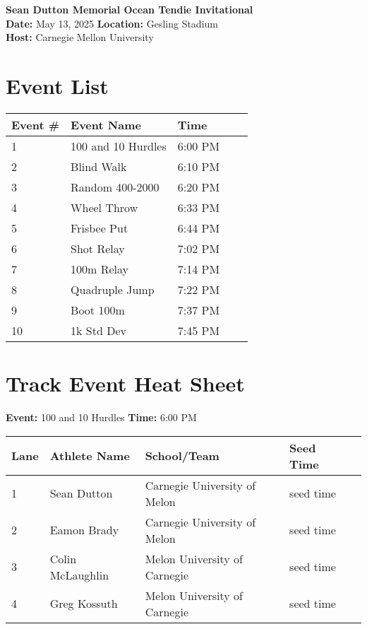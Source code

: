 \documentclass[11pt]{article}
\begin{document}
\begin{center}
    \LARGE \textbf{Sean Dutton Memorial Ocean Tendie Invitational} \\
    \large
    \vspace{0.5em}
    \textbf{Date:} May 13, 2025 \hspace{2cm} \textbf{Location:} Gesling Stadium \\
    \textbf{Host:} Carnegie Mellon University
\end{center}

\vspace{1em}

\section*{Event List}

\begin{tabular}{@{}lllll@{}}
\toprule
\textbf{Event \#} & \textbf{Event Name} &  \textbf{Time} \\
\midrule
1 & 100 and 10 Hurdles & 6:00 PM \\
2 & Blind Walk & 6:10 PM \\
3 & Random 400-2000 & 6:20 PM \\
4 & Wheel Throw & 6:33 PM \\
5 & Frisbee Put & 6:44 PM \\
6 & Shot Relay & 7:02 PM \\
7 & 100m Relay & 7:14 PM \\
8 & Quadruple Jump & 7:22 PM \\
9 & Boot 100m & 7:37 PM \\
10 & 1k Std Dev & 7:45 PM \\
\bottomrule
\end{tabular}



\vspace{2em}

\section*{Track Event Heat Sheet}


\textbf{Event:} 100 and 10 Hurdles \quad \textbf{Time:} 6:00 PM 

\vspace{1em}
\begin{tabular}{@{}lllll@{}}
\toprule
\textbf{Lane} & \textbf{Athlete Name} & \textbf{School/Team} & \textbf{Seed Time} \\
\midrule
1 & Sean Dutton & Carnegie University of Melon & seed time &\\
2 & Eamon Brady & Carnegie University of Melon & seed time &\\
3 & Colin McLaughlin & Melon University of Carnegie & seed time &\\
4 & Greg Kossuth & Melon University of Carnegie & seed time &\\
\bottomrule
\end{tabular}
\vspace{2.5em}
\end{document}
